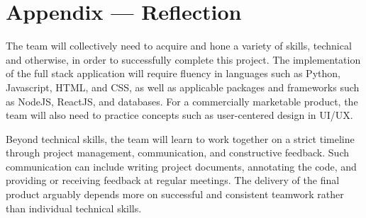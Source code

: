 \documentclass[12pt]{article}
\begin{document}
\newpage{}
\section*{Appendix --- Reflection}

The team will collectively need to acquire and hone a variety of skills, 
technical and otherwise, in order to successfully complete this project. The 
implementation of the full stack application will require fluency in languages 
such as Python, Javascript, HTML, and CSS, as well as applicable packages and 
frameworks such as NodeJS, ReactJS, and databases. For a commercially 
marketable product, the team will also need to practice concepts such as 
user-centered design in UI/UX. 

Beyond technical skills, the team will learn to work together on a strict 
timeline through project management, communication, and constructive feedback. 
Such communication can include writing project documents, annotating the code, 
and providing or receiving feedback at regular meetings. The delivery of the 
final product arguably depends more on successful and consistent teamwork 
rather than individual technical skills.
\end{document}
